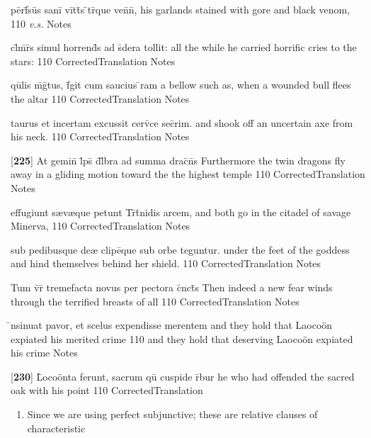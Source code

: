 \latline
  {p\=erf\={}s\=us s\-an\-i\={} v\=itt\={}s \={}tr\={}qu\-e v\-en\={}n\={},}
  { his garlands stained with gore and black venom, }
  {110}
  { \emph{v.s.} }
  { Notes }


\latline
  {cl\={}m\={}r\={}s simul horrend\={}s ad s\={\macron {\i}}dera tollit:}
  { all the while he carried horrific cries to the stars: }
  {110}
  { CorrectedTranslation }
  { Notes }


\latline
  {qu\={}lis m\={}g\={\macron {\i}}tus, f\={}git cum saucius \={}ram}
  { a bellow such as, when a wounded bull flees the altar }
  {110}
  { CorrectedTranslation }
  { Notes }


\latline
  {taurus et incertam excussit cerv\={\macron {\i}}ce sec\={}rim.}
  { and shook off an uncertain axe from his neck.  }
  {110}
  { CorrectedTranslation }
  { Notes }


\latline
  {[\textbf{225}] At gemin\={\macron {\i}} l\={}ps\={} d\={}l\={}bra ad summa drac\={}n\={}s}
  { Furthermore the twin dragons fly away in a gliding motion toward the the highest temple }
  {110}
  { CorrectedTranslation }
  { Notes }


\latline
  {effugiunt s{\ae}v{\ae}que petunt Tr\={\macron {\i}}t\={}nidis arcem,}
  { and both go in the citadel of savage Minerva, }
  {110}
  { CorrectedTranslation }
  { Notes }


\latline
  {sub pedibusque de{\ae} clipe\={\macron {\i}}que sub orbe teguntur.}
  { under the feet of the goddess and hind themselves behind her shield. }
  {110}
  { CorrectedTranslation }
  { Notes }


\latline
  {Tum v\={}r\={} tremefacta novus per pectora c\={}nct\={\macron {\i}}s}
  { Then indeed a new fear winds through the terrified breasts of all }
  {110}
  { CorrectedTranslation }
  { Notes }


\latline
  {\={\macron {\i}}nsinuat pavor, et scelus expendisse merentem}
  { and they hold that Laoco\"on expiated his merited crime  }
  {110}
  { and they hold that deserving Laoco\"on expiated his crime  }
  { Notes }


\latline
  {[\textbf{230}] L\={}oco\"{o}nta ferunt, sacrum qu\={\macron {\i}} cuspide r\={}bur }
  { he who had offended the sacred oak with his point }
  {110}
  { CorrectedTranslation }
  { \begin{enumerate}
  	\item Since we are using perfect subjunctive; these are relative clauses of characteristic
  \end{enumerate} }


